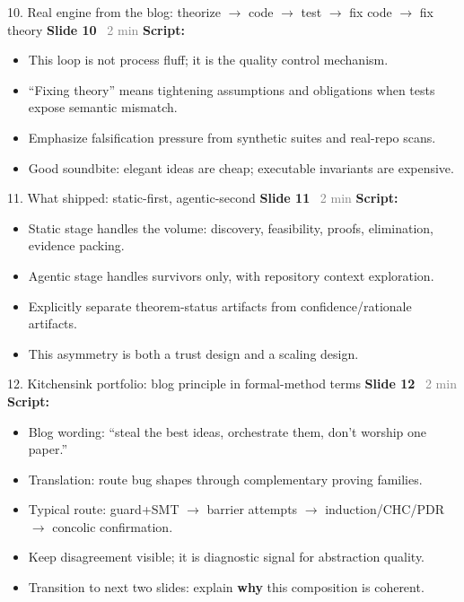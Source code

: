 \documentclass[aspectratio=169]{beamer}
\newcommand{\syncline}[2]{\textbf{#1} \hfill \textcolor{gray}{#2}}
\begin{document}
\begin{frame}{10. Real engine from the blog: theorize \(\rightarrow\) code \(\rightarrow\) test \(\rightarrow\) fix code \(\rightarrow\) fix theory}
\syncline{Slide 10}{~2 min}
\textbf{Script:}
\begin{itemize}
  \item This loop is not process fluff; it is the quality control mechanism.
  \item ``Fixing theory'' means tightening assumptions and obligations when tests expose semantic mismatch.
  \item Emphasize falsification pressure from synthetic suites and real-repo scans.
  \item Good soundbite: elegant ideas are cheap; executable invariants are expensive.
\end{itemize}
\end{frame}

\begin{frame}{11. What shipped: static-first, agentic-second}
\syncline{Slide 11}{~2 min}
\textbf{Script:}
\begin{itemize}
  \item Static stage handles the volume: discovery, feasibility, proofs, elimination, evidence packing.
  \item Agentic stage handles survivors only, with repository context exploration.
  \item Explicitly separate theorem-status artifacts from confidence/rationale artifacts.
  \item This asymmetry is both a trust design and a scaling design.
\end{itemize}
\end{frame}

\begin{frame}{12. Kitchensink portfolio: blog principle in formal-method terms}
\syncline{Slide 12}{~2 min}
\textbf{Script:}
\begin{itemize}
  \item Blog wording: ``steal the best ideas, orchestrate them, don't worship one paper.''
  \item Translation: route bug shapes through complementary proving families.
  \item Typical route: guard+SMT \(\rightarrow\) barrier attempts \(\rightarrow\) induction/CHC/PDR \(\rightarrow\) concolic confirmation.
  \item Keep disagreement visible; it is diagnostic signal for abstraction quality.
  \item Transition to next two slides: explain \textbf{why} this composition is coherent.
\end{itemize}
\end{frame}
\end{document}
